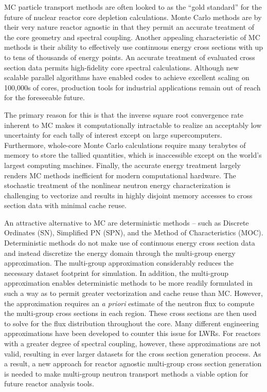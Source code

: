 \ac{MC} particle transport methods are often looked to as the ``gold standard'' for the future of nuclear reactor core depletion calculations. Monte Carlo methods are by their very nature reactor agnostic in that they permit an accurate treatment of the core geometry and spectral coupling. Another appealing characteristic of \ac{MC} methods is their ability to effectively use continuous energy cross sections with up to tens of thousands of energy points. An accurate treatment of evaluated cross section data permits high-fidelity core spectral calculations. Although new scalable parallel algorithms have
enabled codes to achieve excellent scaling on 100,000s of cores, production tools for industrial applications remain out of reach for the foreseeable future.

The primary reason for this is that the inverse square root convergence rate inherent to \ac{MC} makes it computationally intractable to realize an acceptably low uncertainty for each tally of interest except on large supercomputers. Furthermore, whole-core Monte Carlo calculations require many terabytes of memory to store the tallied quantities, which is inaccessible except on the world's largest computing machines. Finally, the accurate energy treatment largely renders \ac{MC} methods inefficient for modern computational hardware. The stochastic treatment of the nonlinear neutron energy characterization is challenging to vectorize and results in highly disjoint memory accesses to cross section data with minimal cache reuse. 

An attractive alternative to MC are deterministic methods -- such as Discrete Ordinates (SN), Simplified PN (SPN), and the Method of Characteristics (MOC). Deterministic methods do not make use of continuous energy cross section data and instead discretize the energy domain through the multi-group energy approximation. The multi-group approximation considerably reduces the necessary dataset footprint for simulation. In addition, the multi-group approximation enables deterministic methods to be more readily formulated in such a way as to permit greater vectorization and cache reuse than \ac{MC}. However, the approximation requires an \textit{a priori} estimate of the neutron flux to compute the multi-group cross sections in each region. These cross sections are then used to solve for the flux distribution throughout the core. Many different engineering approximations have been developed to counter this issue for LWRs. For reactors with a greater degree of spectral coupling, however, these approximations are not valid, resulting in ever larger datasets for the cross section generation process. As a result, a new approach for reactor agnostic multi-group cross section generation is needed to make multi-group neutron transport methods a viable option for future reactor analysis tools.

